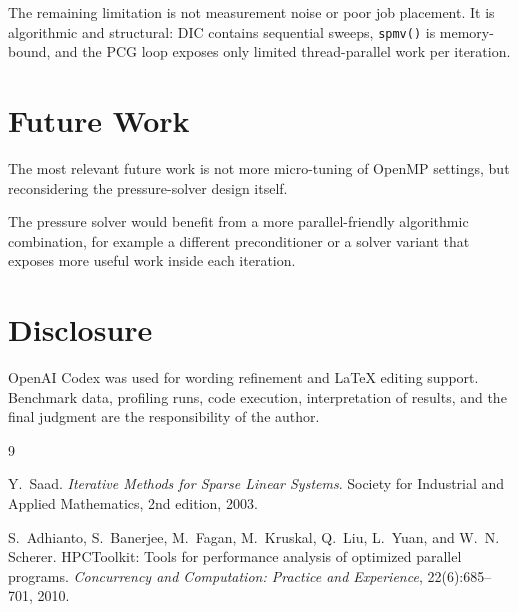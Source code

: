 \documentclass[10pt,firstlineindent,nopartpage,article,accentcolor=tud1b]{tudreport}
\begin{document}
The remaining limitation is not measurement noise or poor job placement. It is
algorithmic and structural: DIC contains sequential sweeps, \texttt{spmv()} is
memory-bound, and the PCG loop exposes only limited thread-parallel work per
iteration.

\section{Future Work}
The most relevant future work is not more micro-tuning of OpenMP settings, but
reconsidering the pressure-solver design itself.

The pressure solver would benefit from a more parallel-friendly algorithmic
combination, for example a different preconditioner or a solver variant that
exposes more useful work inside each iteration.

\section*{Disclosure}
OpenAI Codex was used for wording refinement and \LaTeX{} editing support.
Benchmark data, profiling runs, code execution, interpretation of results, and
the final judgment are the responsibility of the author.

\begin{thebibliography}{9}

Y.~Saad.
\newblock \emph{Iterative Methods for Sparse Linear Systems}.
\newblock Society for Industrial and Applied Mathematics, 2nd edition, 2003.

S.~Adhianto, S.~Banerjee, M.~Fagan, M.~Kruskal, Q.~Liu, L.~Yuan, and
W.~N. Scherer.
\newblock HPCToolkit: Tools for performance analysis of optimized parallel
programs.
\newblock \emph{Concurrency and Computation: Practice and Experience},
22(6):685--701, 2010.

\end{thebibliography}
\end{document}
